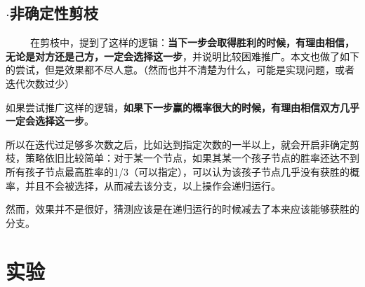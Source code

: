 \documentclass[9pt,twocolumn,twoside]{osajnl}
\begin{document}
\subsection{$\cdot$非确定性剪枝}
\begin{adjustwidth}{2em}{}	
	\ \ \ \ \
		在剪枝中，提到了这样的逻辑：\textbf{当下一步会取得胜利的时候，有理由相信，无论是对方还是己方，一定会选择这一步}，并说明比较困难推广。本文也做了如下的尝试，但是效果都不尽人意。（然而也并不清楚为什么，可能是实现问题，或者迭代次数过少）
		
		如果尝试推广这样的逻辑，\textbf{如果下一步赢的概率很大的时候，有理由相信双方几乎一定会选择这一步}。
		
		所以在迭代过足够多次数之后，比如达到指定次数的一半以上，就会开启非确定剪枝，策略依旧比较简单：对于某一个节点，如果其某一个孩子节点的胜率还达不到所有孩子节点最高胜率的1/3（可以指定），可以认为该孩子节点几乎没有获胜的概率，并且不会被选择，从而减去该分支，以上操作会递归运行。
		
		然而，效果并不是很好，猜测应该是在递归运行的时候减去了本来应该能够获胜的分支。
\end{adjustwidth}

\section{实验}
\end{document}

